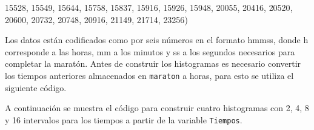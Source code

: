 \documentclass[10pt,]{krantz}
\makeatletter
\newenvironment{Shaded}{\begin{snugshade}}{\end{snugshade}}
\newcommand{\DecValTok}[1]{\textcolor[rgb]{0.00,0.00,0.81}{{#1}}}
\newcommand{\StringTok}[1]{\textcolor[rgb]{0.31,0.60,0.02}{{#1}}}
\newcommand{\NormalTok}[1]{{#1}}
\newenvironment{kframe}{%
\medskip{}
\setlength{\fboxsep}{.8em}
 \def\at@end@of@kframe{}%
 \ifinner\ifhmode%
  \def\at@end@of@kframe{\end{minipage}}%
  \begin{minipage}{\columnwidth}%
 \fi\fi%
 \def\FrameCommand##1{\hskip\@totalleftmargin \hskip-\fboxsep
 \colorbox{shadecolor}{##1}\hskip-\fboxsep
     \hskip-\linewidth \hskip-\@totalleftmargin \hskip\columnwidth}%
 \MakeFramed {\advance\hsize-\width
   \@totalleftmargin\z@ \linewidth\hsize
   \@setminipage}}%
 {\par\unskip\endMakeFramed%
 \at@end@of@kframe}
\renewenvironment{Shaded}{\begin{kframe}}{\end{kframe}}
\makeatother
\begin{document}
\begin{Shaded}
\begin{Highlighting}[]
\DecValTok{15528}\NormalTok{, }\DecValTok{15549}\NormalTok{, }\DecValTok{15644}\NormalTok{, }\DecValTok{15758}\NormalTok{, }\DecValTok{15837}\NormalTok{, }\DecValTok{15916}\NormalTok{, }\DecValTok{15926}\NormalTok{, }\DecValTok{15948}\NormalTok{, }\DecValTok{20055}\NormalTok{, }
\DecValTok{20416}\NormalTok{, }\DecValTok{20520}\NormalTok{, }\DecValTok{20600}\NormalTok{, }\DecValTok{20732}\NormalTok{, }\DecValTok{20748}\NormalTok{, }\DecValTok{20916}\NormalTok{, }\DecValTok{21149}\NormalTok{, }\DecValTok{21714}\NormalTok{, }\DecValTok{23256}\NormalTok{)}
\end{Highlighting}
\end{Shaded}

Los datos están codificados como por seis números en el formato hmmss,
donde h corresponde a las horas, mm a los minutos y ss a los segundos
necesarios para completar la maratón. Antes de construir los histogramas
es necesario convertir los tiempos anteriores almacenados en
\texttt{maraton} a horas, para esto se utiliza el siguiente código.

\begin{Shaded}
\end{Shaded}

A continuación se muestra el código para construir cuatro histogramas
con 2, 4, 8 y 16 intervalos para los tiempos a partir de la variable
\texttt{Tiempos}.
\end{document}
